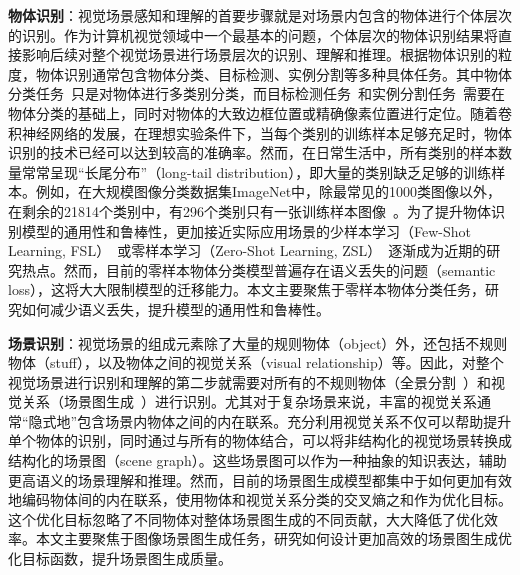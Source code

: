 \begin{asparaenum}
\item \textbf{物体识别}：视觉场景感知和理解的首要步骤就是对场景内包含的物体进行个体层次的识别。作为计算机视觉领域中一个最基本的问题，个体层次的物体识别结果将直接影响后续对整个视觉场景进行场景层次的识别、理解和推理。根据物体识别的粒度，物体识别通常包含物体分类、目标检测、实例分割等多种具体任务。其中物体分类任务~\cite{russakovsky2015imagenet,krizhevsky2012imagenet,simonyan2015very,szegedy2015going,he2016deep,xie2017aggregated,hu2018squeeze}只是对物体进行多类别分类，而目标检测任务~\cite{ren2015faster,liu2016ssd,redmon2016you}和实例分割任务~\cite{he2017mask}需要在物体分类的基础上，同时对物体的大致边框位置或精确像素位置进行定位。随着卷积神经网络的发展，在理想实验条件下，当每个类别的训练样本足够充足时，物体识别的技术已经可以达到较高的准确率。然而，在日常生活中，所有类别的样本数量常常呈现“长尾分布”（long-tail distribution），即大量的类别缺乏足够的训练样本。例如，在大规模图像分类数据集ImageNet中，除最常见的1000类图像以外，在剩余的21814个类别中，有296个类别只有一张训练样本图像~\cite{russakovsky2015imagenet}。为了提升物体识别模型的通用性和鲁棒性，更加接近实际应用场景的少样本学习（Few-Shot Learning, FSL）~\cite{fei2006one}或零样本学习（Zero-Shot Learning, ZSL）~\cite{lampert2009learning}逐渐成为近期的研究热点。然而，目前的零样本物体分类模型普遍存在语义丢失的问题（semantic loss），这将大大限制模型的迁移能力。本文主要聚焦于零样本物体分类任务，研究如何减少语义丢失，提升模型的通用性和鲁棒性。

\item \textbf{场景识别}：视觉场景的组成元素除了大量的规则物体（object）外，还包括不规则物体（stuff），以及物体之间的视觉关系（visual relationship）等。因此，对整个视觉场景进行识别和理解的第二步就需要对所有的不规则物体（全景分割~\cite{kirillov2019panoptic}）和视觉关系（场景图生成~\cite{johnson2015image}）进行识别。尤其对于复杂场景来说，丰富的视觉关系通常“隐式地”包含场景内物体之间的内在联系。充分利用视觉关系不仅可以帮助提升单个物体的识别，同时通过与所有的物体结合，可以将非结构化的视觉场景转换成结构化的场景图（scene graph）。这些场景图可以作为一种抽象的知识表达，辅助更高语义的场景理解和推理。然而，目前的场景图生成模型都集中于如何更加有效地编码物体间的内在联系，使用物体和视觉关系分类的交叉熵之和作为优化目标。这个优化目标忽略了不同物体对整体场景图生成的不同贡献，大大降低了优化效率。本文主要聚焦于图像场景图生成任务，研究如何设计更加高效的场景图生成优化目标函数，提升场景图生成质量。


\end{asparaenum}
